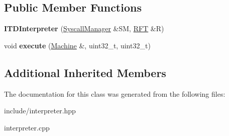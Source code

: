 \subsection*{Public Member Functions}
\begin{DoxyCompactItemize}
\item 
{\bfseries I\+T\+D\+Interpreter} (\hyperlink{classdbt_1_1_syscall_manager}{Syscall\+Manager} \&SM, \hyperlink{classdbt_1_1_r_f_t}{R\+FT} \&R)\hypertarget{classdbt_1_1_i_t_d_interpreter_a4fc8b1be8480fb7a395dfebd553ee641}{}\label{classdbt_1_1_i_t_d_interpreter_a4fc8b1be8480fb7a395dfebd553ee641}

\item 
void {\bfseries execute} (\hyperlink{classdbt_1_1_machine}{Machine} \&, uint32\+\_\+t, uint32\+\_\+t)\hypertarget{classdbt_1_1_i_t_d_interpreter_a0506c48bb8ee16c5b68823f2b1a3b626}{}\label{classdbt_1_1_i_t_d_interpreter_a0506c48bb8ee16c5b68823f2b1a3b626}

\end{DoxyCompactItemize}
\subsection*{Additional Inherited Members}


The documentation for this class was generated from the following files\+:\begin{DoxyCompactItemize}
\item 
include/interpreter.\+hpp\item 
interpreter.\+cpp\end{DoxyCompactItemize}
